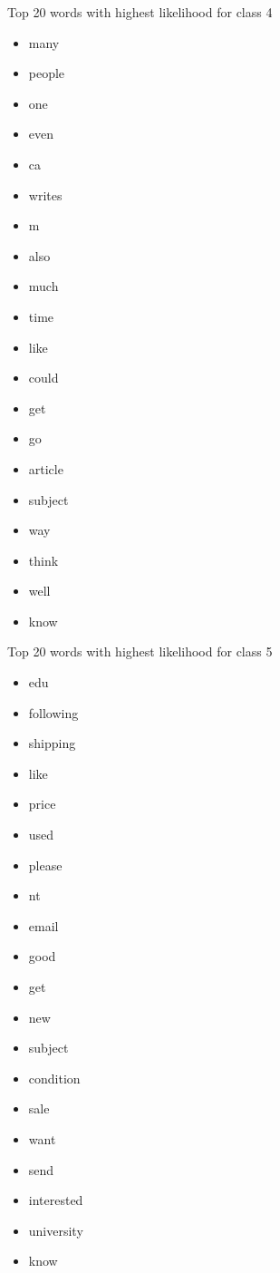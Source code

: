 \begin{multicols*}{2}
Top 20 words with highest likelihood for class 4
\begin{itemize}
  \item many
  \item people
  \item one
  \item even
  \item ca
  \item writes
  \item m
  \item also
  \item much
  \item time
  \item like
  \item could
  \item get
  \item go
  \item article
  \item subject
  \item way
  \item think
  \item well
  \item know
\end{itemize}

Top 20 words with highest likelihood for class 5
\begin{itemize}
  \item edu
  \item following
  \item shipping
  \item like
  \item price
  \item used
  \item please
  \item nt
  \item email
  \item good
  \item get
  \item new
  \item subject
  \item condition
  \item sale
  \item want
  \item send
  \item interested
  \item university
  \item know
\end{itemize}


\end{multicols*}

